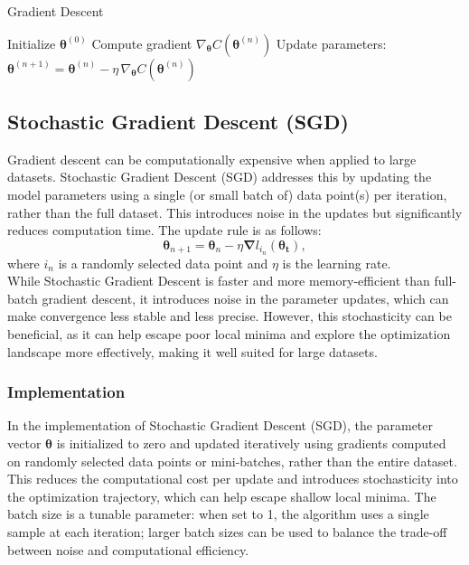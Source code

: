 \documentclass[
 reprint,            %
 amsmath,amssymb,
 aps,
]{revtex4-2}
\begin{document}
\begin{algorithm}[H]
\caption{Gradient Descent}
\begin{algorithmic}[1]
\State Initialize $\boldsymbol{\theta}^{(0)}$
    \State Compute gradient $\nabla_{\boldsymbol{\theta}} C(\boldsymbol{\theta}^{(n)})$
    \State Update parameters: 
    $\boldsymbol{\theta}^{(n+1)} = \boldsymbol{\theta}^{(n)} - \eta \, \nabla_{\boldsymbol{\theta}} C(\boldsymbol{\theta}^{(n)})$
\EndFor
\end{algorithmic}
\end{algorithm}

\subsection{Stochastic Gradient Descent (SGD)}
Gradient descent can be computationally expensive when applied to large datasets.
Stochastic Gradient Descent (SGD) addresses this by updating the model parameters using a single (or small batch of) data point(s) per iteration, rather than the full dataset\cite{hjorthjensen_week37}.
This introduces noise in the updates but significantly reduces computation time.
The update rule is as follows:  
$$
\boldsymbol{\theta}_{n+1} = \boldsymbol{\theta}_n - {\eta \boldsymbol{\nabla}} l_{i_n} (\boldsymbol{\theta_t}),
$$  
where \(i_n\) is a randomly selected data point and \(\eta\) is the learning rate. \\

While Stochastic Gradient Descent is faster and more memory-efficient than full-batch gradient descent, it introduces noise in the parameter updates, which can make convergence less stable and less precise. However, this stochasticity can be beneficial, as it can help escape poor local minima and explore the optimization landscape more effectively, making it well suited for large datasets. \cite{hjorthjensen_week37}

\subsubsection{Implementation}

In the implementation of Stochastic Gradient Descent (SGD), the parameter vector $\boldsymbol{\theta}$ is initialized to zero and updated iteratively using gradients computed on randomly selected data points or mini-batches, rather than the entire dataset. This reduces the computational cost per update and introduces stochasticity into the optimization trajectory, which can help escape shallow local minima. 
The batch size is a tunable parameter: when set to 1, the algorithm uses a single sample at each iteration; larger batch sizes can be used to balance the trade-off between noise and computational efficiency.
\end{document}
